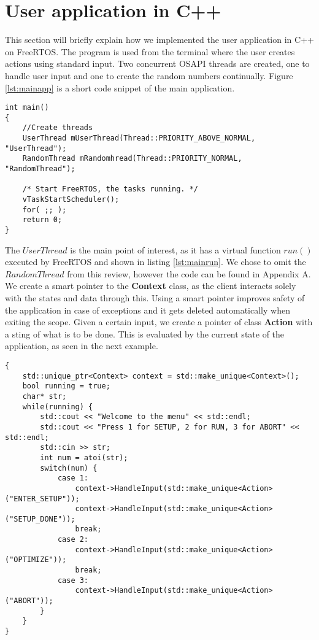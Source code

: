 \section{User application in C++}

This section will briefly explain how we implemented the user application in C++ on FreeRTOS. The program is used from the terminal where the user creates actions using standard input. Two concurrent OSAPI threads are created, one to handle user input and one to create the random numbers continually. Figure \ref{lst:mainapp} is a short code snippet of the main application.

\begin{lstlisting}[style=customc++,caption={Main application, where two threads are created and the scheduler started.},label={lst:mainapp}]
int main()
{
	//Create threads
	UserThread mUserThread(Thread::PRIORITY_ABOVE_NORMAL, "UserThread");
	RandomThread mRandomhread(Thread::PRIORITY_NORMAL, "RandomThread");

	/* Start FreeRTOS, the tasks running. */
	vTaskStartScheduler();
	for( ;; );
	return 0;
}
\end{lstlisting}

The $UserThread$ is the main point of interest, as it has a virtual function $run()$ executed by FreeRTOS and shown in listing \ref{lst:mainrun}. We chose to omit the $RandomThread$ from this review, however the code can be found in Appendix A. We create a smart pointer to the \textbf{Context} class, as the client interacts solely with the states and data through this. Using a smart pointer improves safety of the application in case of exceptions and it gets deleted automatically when exiting the scope. Given a certain input, we create a pointer of class \textbf{Action} with a sting of what is to be done. This is evaluated by the current state of the application, as seen in the next example.

\begin{lstlisting}[style=customc++,caption={Main application, where two threads are created with a scheduler.},label={lst:mainrun}]
{
	std::unique_ptr<Context> context = std::make_unique<Context>();
	bool running = true;
	char* str;
	while(running) {
		std::cout << "Welcome to the menu" << std::endl;
		std::cout << "Press 1 for SETUP, 2 for RUN, 3 for ABORT" << std::endl;
		std::cin >> str;
		int num = atoi(str);
		switch(num) {
			case 1:
				context->HandleInput(std::make_unique<Action>("ENTER_SETUP"));
				context->HandleInput(std::make_unique<Action>("SETUP_DONE"));
				break;
			case 2:
				context->HandleInput(std::make_unique<Action>("OPTIMIZE"));
				break;
			case 3:
				context->HandleInput(std::make_unique<Action>("ABORT"));
		}
	}
}
\end{lstlisting}


